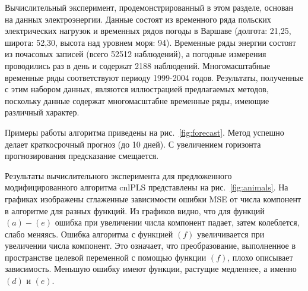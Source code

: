 \documentclass[12pt,twoside]{article}
\begin{document}
Вычислительный эксперимент, продемонстрированный в этом разделе, основан на данных электроэнергии. Данные состоят из временного ряда польских электрических нагрузок и временных рядов погоды в Варшаве (долгота: 21,25, широта: 52,30, высота над уровнем моря: 94). Временные ряды энергии состоят из почасовых записей (всего 52512 наблюдений), а погодные измерения проводились раз в день и содержат 2188 наблюдений. Многомасштабные временные ряды соответствуют периоду 1999-2004 годов. Результаты, полученные с этим набором данных, являются иллюстрацией предлагаемых методов, поскольку данные содержат многомасштабне временные ряды, имеющие различный характер.

Примеры работы алгоритма приведены на рис.~\ref{fig:forecast}. Метод успешно делает краткосрочный прогноз (до 10 дней). С увеличением горизонта прогнозирования предсказание смещается. 




Результаты вычислительного эксперимента для предложенного модифицированного алгоритма cnlPLS представлены на рис.~\ref{fig:animals}. На графиках изображены сглаженные зависимости ошибки MSE от числа компонент в алгоритме для разных функций. Из графиков видно, что для функций $(a)-(e)$ ошибка при увеличении числа компонент падает, затем колеблется, слабо меняясь. Ошибка алгоритма с функцией $(f)$ увеличивается при увеличении числа компонент. Это означает, что преобразование, выполненное в пространстве целевой переменной с помощью функции $(f)$, плохо описывает зависимость. Меньшую ошибку имеют функции, растущие медленнее, а именно $(d)$ и $(e)$. 
\end{document}
